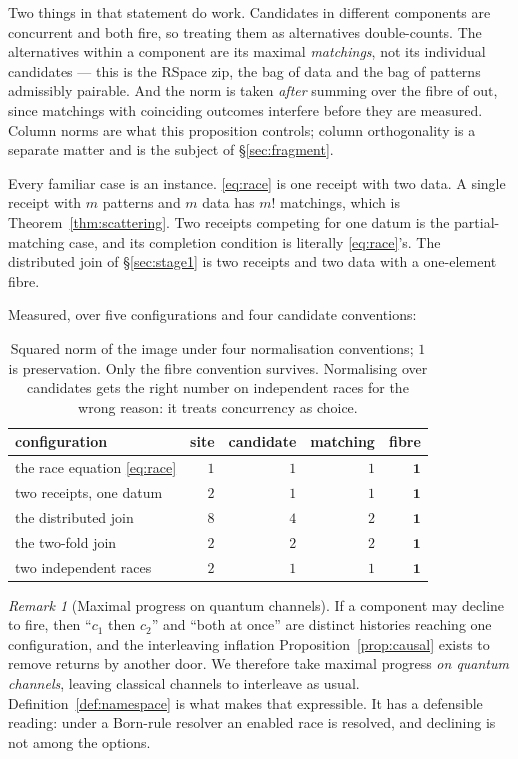 \documentclass[11pt,a4paper]{article}
\theoremstyle{plain}
\theoremstyle{definition}
\theoremstyle{remark}
\newtheorem{remark}[theorem]{Remark}
\newcommand{\Out}{\mathrm{out}}
\begin{document}
Two things in that statement do work. Candidates in
different components are concurrent and both fire, so treating them as
alternatives double-counts. The alternatives within a component are its maximal
\emph{matchings}, not its individual candidates --- this is the RSpace zip, the
bag of data and the bag of patterns admissibly pairable. And the norm is taken
\emph{after} summing over the fibre of $\Out$, since matchings with coinciding
outcomes interfere before they are measured. Column norms are what this
proposition controls; column orthogonality is a separate matter and is the
subject of \S\ref{sec:fragment}.

Every familiar case is an instance. \eqref{eq:race} is one receipt with two
data. A single receipt with $m$ patterns and $m$ data has $m!$ matchings, which
is Theorem~\ref{thm:scattering}. Two receipts competing for one datum is the
partial-matching case, and its completion condition is literally
\eqref{eq:race}'s. The distributed join of \S\ref{sec:stage1} is two receipts
and two data with a one-element fibre.

Measured, over five configurations and four candidate conventions:

\begin{table}[h]
\centering\small
\begin{tabular}{@{}lrrrr@{}}
\toprule
configuration & site & candidate & matching & \textbf{fibre} \\
\midrule
the race equation \eqref{eq:race}     & $1$ & $1$ & $1$ & $\mathbf{1}$ \\
two receipts, one datum               & $2$ & $1$ & $1$ & $\mathbf{1}$ \\
the distributed join                  & $8$ & $4$ & $2$ & $\mathbf{1}$ \\
the two-fold join                     & $2$ & $2$ & $2$ & $\mathbf{1}$ \\
two independent races                 & $2$ & $1$ & $1$ & $\mathbf{1}$ \\
\bottomrule
\end{tabular}
\caption{Squared norm of the image under four normalisation conventions;
$1$ is preservation. Only the fibre convention survives. Normalising over
candidates gets the right number on independent races for the wrong reason: it
treats concurrency as choice.}\label{tab:conventions}
\end{table}

\begin{remark}[Maximal progress on quantum channels]\label{rem:maxprog}
If a component may decline to fire, then ``$c_1$ then $c_2$'' and ``both at
once'' are distinct histories reaching one configuration, and the interleaving
inflation Proposition~\ref{prop:causal} exists to remove returns by another
door. We therefore take maximal progress \emph{on quantum channels}, leaving
classical channels to interleave as usual. Definition~\ref{def:namespace} is
what makes that expressible. It has a defensible reading: under a Born-rule
resolver an enabled race is resolved, and declining is not among the options.
\end{remark}
\end{document}
